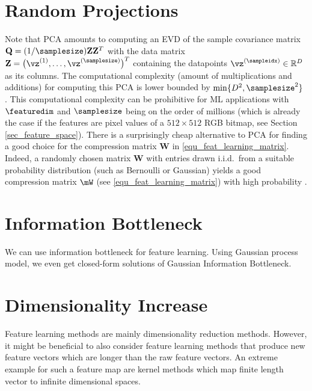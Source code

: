 \documentclass[12pt]{report}
\begin{document}
\section{Random Projections} 
Note that PCA amounts to computing an EVD of the sample covariance matrix 
$\mathbf{Q} = (1/\samplesize) \mathbf{Z} \mathbf{Z}^{T}$ with the data matrix 
$\mathbf{Z} = \big(\vz^{(1)},\ldots,\vz^{(\samplesize)}\big)^{T}$ containing the 
datapoints $\vz^{(\sampleidx)} \in \mathbb{R}^{D}$ as its columns. The computational 
complexity (amount of multiplications and additions) for computing this PCA is lower 
bounded by $\min\{ D^{2}, \samplesize^{2} \}$ \cite{Du08low-complexityprincipal,Sharma2007}. 
This computational complexity can be prohibitive for ML applications with $\featuredim$ 
and $\samplesize$ being on the order of millions (which is already the case if the features 
are pixel values of a $512 \times 512$ RGB bitmap, see Section \ref{sec_feature_space}). 
There is a surprisingly cheap alternative to PCA for finding a good choice for the 
compression matrix $\mathbf{W}$ in \eqref{equ_feat_learning_matrix}. Indeed, a randomly 
chosen matrix $\mathbf{W}$ with entries drawn i.i.d.\ from a suitable probability distribution 
(such as Bernoulli or Gaussian) yields a good compression matrix $\mW$ (see \eqref{equ_feat_learning_matrix}) 
with high probability \cite{Bingham01randomprojection,jung-specesttit}. 


\section{Information Bottleneck}
We can use information bottleneck for feature learning. Using Gaussian process model, we even 
get closed-form solutions of Gaussian Information Bottleneck. 


\section{Dimensionality Increase} 
\label{sec_dim_increas} 

Feature learning methods are mainly dimensionality reduction methods. However, it might be 
beneficial to also consider feature learning methods that produce new feature vectors which 
are longer than the raw feature vectors. An extreme example for such a feature map are kernel 
methods which map finite length vector to infinite dimensional spaces. 
\end{document}

